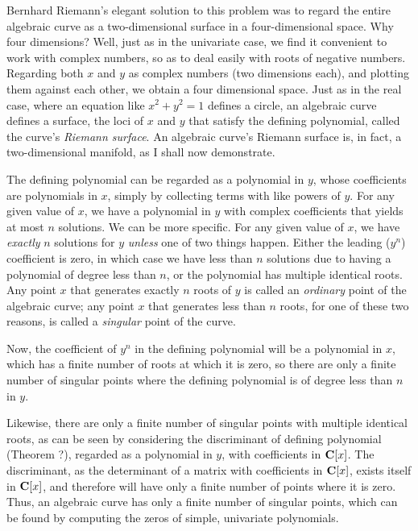 Bernhard Riemann's elegant solution to this problem was to regard the
entire algebraic curve as a two-dimensional surface in a
four-dimensional space.  Why four dimensions?  Well, just as in the
univariate case, we find it convenient to work with complex numbers,
so as to deal easily with roots of negative numbers.  Regarding both
$x$ and $y$ as complex numbers (two dimensions each), and plotting
them against each other, we obtain a four dimensional space.  Just as
in the real case, where an equation like $x^2 + y^2 = 1$ defines a
circle, an algebraic curve defines a surface, the loci of $x$ and $y$
that satisfy the defining polynomial, called the curve's {\it Riemann
surface}.  An algebraic curve's Riemann surface is, in fact, a
two-dimensional manifold, as I shall now demonstrate.

The defining polynomial can be regarded as a polynomial in $y$, whose
coefficients are polynomials in $x$, simply by collecting terms with
like powers of $y$.  For any given value of $x$, we have a polynomial
in $y$ with complex coefficients that yields at most $n$ solutions.
We can be more specific.  For any given value of $x$, we have {\it
exactly} $n$ solutions for $y$ {\it unless} one of two things happen.
Either the leading ($y^n$) coefficient is zero, in which case we have
less than $n$ solutions due to having a polynomial of degree less than
$n$, or the polynomial has multiple identical roots.  Any point $x$
that generates exactly $n$ roots of $y$ is called an {\it ordinary}
point of the algebraic curve; any point $x$ that generates less than
$n$ roots, for one of these two reasons, is called a {\it singular}
point of the curve.

Now, the coefficient of $y^n$ in the defining polynomial will be a
polynomial in $x$, which has a finite number of roots at which it is
zero, so there are only a finite number of singular points where the
defining polynomial is of degree less than $n$ in $y$.

Likewise, there are only a finite number of singular points with
multiple identical roots, as can be seen by considering the
discriminant of defining polynomial (Theorem ?), regarded as a
polynomial in $y$, with coefficients in ${\bf C}[x]$.  The
discriminant, as the determinant of a matrix with coefficients in
${\bf C}[x]$, exists itself in ${\bf C}[x]$, and therefore will have
only a finite number of points where it is zero.  Thus, an algebraic
curve has only a finite number of singular points, which can be found
by computing the zeros of simple, univariate polynomials.

